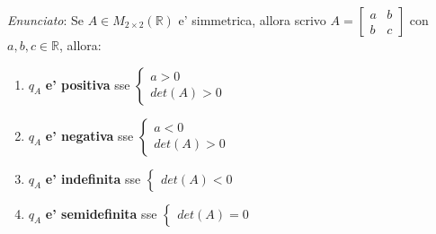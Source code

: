 \documentclass{article}
\begin{document}
\emph{Enunciato}: Se $A \in M_{2 \times 2} (\mathbb{R})$ e' simmetrica, allora scrivo
$A = \begin{bmatrix} a & b \\ b & c \end{bmatrix}$ con $a, b, c \in \mathbb{R}$,
allora:
\begin{enumerate}
  \item $q_A$ \textbf{e' positiva} sse $\begin{cases} a > 0 \\ det(A) > 0 \end{cases}$
  \item $q_A$ \textbf{e' negativa} sse $\begin{cases} a < 0 \\ det(A) > 0 \end{cases}$
  \item $q_A$ \textbf{e' indefinita} sse $\begin{cases} det(A) < 0 \end{cases}$
  \item $q_A$ \textbf{e' semidefinita} sse $\begin{cases} det(A) = 0 \end{cases}$
\end{enumerate}
\end{document}
